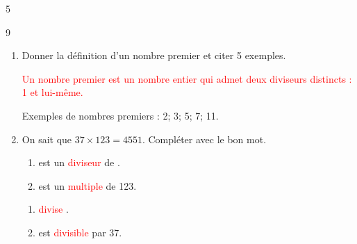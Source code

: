 \documentclass[a4paper]{book}
\begin{document}
{\begin{exerciceNote}{5}
\begin{enumerate}[leftmargin=*]
\begin{minipage}{0.45\linewidth}
                \vspace{1cm}
            \end{minipage}
        \end{enumerate}       
    \end{exerciceNote}


    \begin{exerciceNote}{9}
        \begin{enumerate}[leftmargin=*]
            \item Donner la définition d'un nombre premier et citer 5 exemples.

            \textcolor{red}{Un nombre premier est un nombre entier qui admet deux diviseurs distincts : 1 et lui-même.}

            Exemples de nombres premiers : 2; 3; 5; 7; 11.

            \item On sait que $37\times123=4551$.
            Compléter avec le bon mot.

            \medskip
            
            \begin{minipage}{0.45\linewidth}                
                \begin{enumerate}
                    \item {} est un \textcolor{red}{diviseur} de .

                    \medskip
                    
                    \item {} est un \textcolor{red}{multiple} de 123.
                \end{enumerate}
            \end{minipage}
            \hfill\vline\hfill
            \begin{minipage}{0.45\linewidth}
                \begin{enumerate}
                    \item {}  \textcolor{red}{divise} .

                    \medskip
                    
                    \item {} est \textcolor{red}{divisible} par 37.
                \end{enumerate}
            
            \end{minipage}


\end{enumerate}
\end{exerciceNote}}
\end{document}
